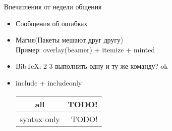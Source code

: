 
\begin{frame}{Впечатления от недели общения}
  \begin{itemize}
    \pause
    \item Сообщения об ошибках
    \pause
    \item Магия(Пакеты мешают друг другу) \\
      Пример: overlay(beamer) + itemize + minted
    \pause  
    \item BibTeX: 2-3 выполнить одну и ту же команду? ok 
    \pause
    \item include + includeonly \\
      \begin{tabular}{ c | r }
        all & TODO! \\ \hline
        syntax only & TODO! \\
      \end{tabular}
  \end{itemize}
\end{frame}

